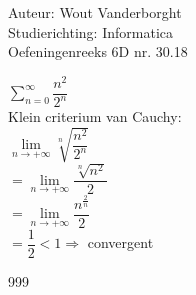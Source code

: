 \documentclass[a4paper]{article}
\newcommand{\Limit}{\lim\limits_}
\begin{document}
  
\noindent \large Auteur: Wout Vanderborght\\
\noindent \large Studierichting: Informatica\\
\noindent \large Oefeningenreeks 6D nr. 30.18\\

\medskip

\normalsize

$ \displaystyle\sum_{n=0}^{\infty} \dfrac{n^2}{2^n} $ \\

Klein criterium van Cauchy: \\

$ \Limit{n \rightarrow +\infty} \sqrt[n]{\dfrac{n^2}{2^n}} $ \\

$ = \Limit{n \rightarrow +\infty} \dfrac{\sqrt[n]{n^2}}{2} $ \\

$ = \Limit{n \rightarrow +\infty} \dfrac{n^{\tfrac{2}{n}}}{2} $ \\

$ = \dfrac{1}{2} < 1 \Rightarrow $ convergent \\

\begin{thebibliography}{999}
\end{thebibliography}
\end{document}
